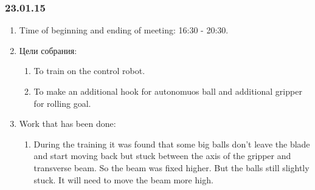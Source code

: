 \subsubsection{23.01.15}
\begin{enumerate}
	
	\item Time of beginning and ending of meeting: 16:30 - 20:30.
	
	\item Цели собрания: 
	\begin{enumerate}
		
		\item To train on the control robot.
		
		\item To make an additional hook for autonomuos ball and additional gripper for rolling goal.
		
	\end{enumerate}

	\item Work that has been done:
	\begin{enumerate}
		
		\item During the training it was found that some big balls don't leave the blade and start moving back but stuck between the axis of the gripper and transverse beam. So the beam was fixed higher. But the balls still slightly stuck. It will need to move the beam more high.
		

\end{enumerate}
\end{enumerate}
